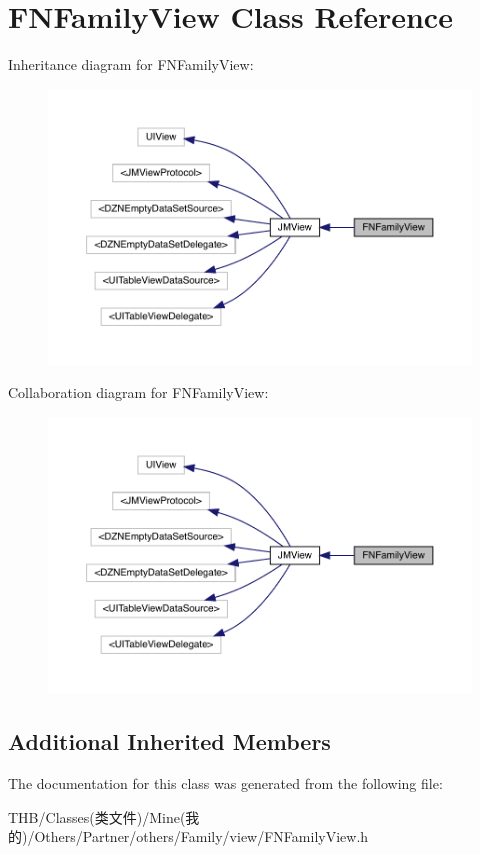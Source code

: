 \hypertarget{interface_f_n_family_view}{}\section{F\+N\+Family\+View Class Reference}
\label{interface_f_n_family_view}


Inheritance diagram for F\+N\+Family\+View\+:\nopagebreak
\begin{figure}[H]
\begin{center}
\leavevmode
\includegraphics[width=350pt]{interface_f_n_family_view__inherit__graph}
\end{center}
\end{figure}


Collaboration diagram for F\+N\+Family\+View\+:\nopagebreak
\begin{figure}[H]
\begin{center}
\leavevmode
\includegraphics[width=350pt]{interface_f_n_family_view__coll__graph}
\end{center}
\end{figure}
\subsection*{Additional Inherited Members}


The documentation for this class was generated from the following file\+:\begin{DoxyCompactItemize}
\item 
T\+H\+B/\+Classes(类文件)/\+Mine(我的)/\+Others/\+Partner/others/\+Family/view/F\+N\+Family\+View.\+h\end{DoxyCompactItemize}
